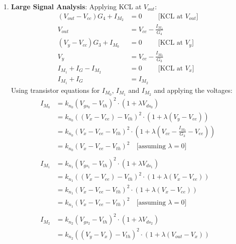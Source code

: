 \begin{enumerate}
  \item \textbf{Large Signal Analysis}:
    Applying KCL at $V_{out}$:
    \begin{align*}
      (V_{out} - V_{cc})G_4 + I_{M_2} &= 0 \hspace{1cm} \text{[KCL at } V_{out}\text{]} \\
      V_{out} &= V_{cc} - \frac{I_{M_2}}{G_4} \tag{1} \\
      (V_{y} - V_{cc})G_3 + I_{M_0} &= 0 \hspace{1cm} \text{[KCL at } V_{y}\text{]} \\
      V_{y} &= V_{cc} - \frac{I_{M_0}}{G_3} \tag{2} \\
      I_{M_1} + I_{G} - I_{M_2} &= 0 \hspace{1cm} \text{[KCL at } V_{x}\text{]} \\
      I_{M_1} + I_{G} &= I_{M_2} \tag{3}
    \end{align*}
    Using transistor equations for $I_{M_0}$, $I_{M_1}$ and $I_{M_2}$
    and applying the voltages:
    \begin{align*}
      I_{M_0} &= k_{n_0}(V_{gs_0} - V_{th})^2 \cdot (1 + \lambda V_{ds_0}) \\
              &= k_{n_0}((V_{x} - V_{ee}) - V_{th})^2 \cdot (1 + \lambda (V_{y} - V_{ee})) \\
              &= k_{n_0}\left(V_{x} - V_{ee} - V_{th}\right)^2 \cdot \left(1 + \lambda \left(V_{cc} - \frac{I_{M_0}}{G_3} - V_{ee}\right)\right) \\
              &= k_{n_0}\left(V_{x} - V_{ee} - V_{th}\right)^2 \quad \text{[assuming } \lambda = 0 \text{]} \tag{4} \\ \\
      I_{M_1} &= k_{n_1}(V_{gs_1} - V_{th})^2 \cdot (1 + \lambda V_{ds_1}) \\
              &= k_{n_1}((V_{x} - V_{ee}) - V_{th})^2 \cdot (1 + \lambda (V_{x} - V_{ee})) \\
              &= k_{n_1}\left(V_{x} - V_{ee} - V_{th}\right)^2 \cdot \left(1 + \lambda (V_{x} - V_{ee})\right) \\
              &= k_{n_1}\left(V_{x} - V_{ee} - V_{th}\right)^2 \quad \text{[assuming } \lambda = 0 \text{]} \tag{5} \\ \\
      I_{M_2} &= k_{n_2}(V_{gs_2} - V_{th})^2 \cdot (1 + \lambda V_{ds_2}) \\
              &= k_{n_2}((V_{y} - V_{x}) - V_{th})^2 \cdot (1 + \lambda (V_{out} - V_{x})) \\

\end{align*}
\end{enumerate}
